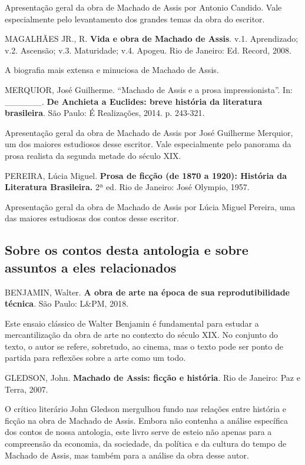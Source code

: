 \documentclass[11pt]{extarticle}
\begin{document}
Apresentação geral da obra de Machado de Assis por Antonio Candido. Vale
especialmente pelo levantamento dos grandes temas da obra do escritor.

MAGALHÃES JR., R. \textbf{Vida e obra de Machado de Assis}. v.1.
Aprendizado; v.2. Ascensão; v.3. Maturidade; v.4. Apogeu. Rio de
Janeiro: Ed. Record, 2008.

A biografia mais extensa e minuciosa de Machado de Assis.

MERQUIOR, José Guilherme. ``Machado de Assis e a prosa impressionista''.
In: \_\_\_\_\_\_. \textbf{De Anchieta a Euclides: breve história da
literatura brasileira}. São Paulo: É Realizações, 2014. p. 243-321.

Apresentação geral da obra de Machado de Assis por José Guilherme
Merquior, um dos maiores estudiosos desse escritor. Vale especialmente
pelo panorama da prosa realista da segunda metade do século XIX.

PEREIRA, Lúcia Miguel. \textbf{Prosa de ficção (de 1870 a 1920):
História da Literatura Brasileira.} 2ª ed. Rio de Janeiro: José Olympio,
1957.

Apresentação geral da obra de Machado de Assis por Lúcia Miguel Pereira,
uma das maiores estudiosas dos contos desse escritor.

\subsection{Sobre os contos desta antologia e sobre assuntos a eles relacionados}

BENJAMIN, Walter. \textbf{A obra de arte na época de sua
reprodutibilidade técnica}. São Paulo: L\&PM, 2018.

Este ensaio clássico de Walter Benjamin é fundamental para estudar a
mercantilização da obra de arte no contexto do século XIX. No conjunto
do texto, o autor se refere, sobretudo, ao cinema, mas o texto pode ser
ponto de partida para reflexões sobre a arte como um todo.

GLEDSON, John. \textbf{Machado de Assis: ficção e história}. Rio de
Janeiro: Paz e Terra, 2007.

O crítico literário John Gledson mergulhou fundo nas relações entre
história e ficção na obra de Machado de Assis. Embora não contenha a
análise específica dos contos de nossa antologia, este livro serve de
esteio não apenas para a compreensão da economia, da sociedade, da
política e da cultura do tempo de Machado de Assis, mas também para a
análise da obra desse autor.
\end{document}
